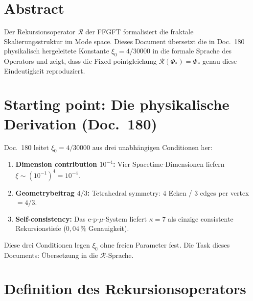 
\section*{Abstract}

Der Rekursionsoperator $\mathcal{R}$ der FFGFT formalisiert die
fraktale Skalierungsstruktur im Mode space. Dieses Document übersetzt
die in Doc.~180 physikalisch hergeleitete Konstante
$\xi_0 = 4/30000$ in die formale Sprache des Operators und zeigt,
dass die Fixed pointgleichung $\mathcal{R}(\Phi_*) = \Phi_*$ genau
diese Eindeutigkeit reproduziert.

\section{Starting point: Die physikalische Derivation (Doc.~180)}

Doc.~180 leitet $\xi_0 = 4/30000$ aus drei unabhängigen Conditionen her:

\begin{enumerate}
  \item \textbf{Dimension contribution $10^{-4}$:}
    Vier Spacetime-Dimensionen liefern $\xi \sim (10^{-1})^4 = 10^{-4}$.
  \item \textbf{Geometrybeitrag $4/3$:}
    Tetrahedral symmetry: $4$ Ecken / $3$ edges per vertex $= 4/3$.
  \item \textbf{Self-consistency:}
    Das e-p-$\mu$-System liefert $\kappa = 7$ als einzige
    consistente Rekursionstiefe ($0{,}04\,\%$ Genauigkeit).
\end{enumerate}

Diese drei Conditionen legen $\xi_0$ ohne freien Parameter fest.
Die Task dieses Documents: Übersetzung in die $\mathcal{R}$-Sprache.

\section{Definition des Rekursionsoperators}

